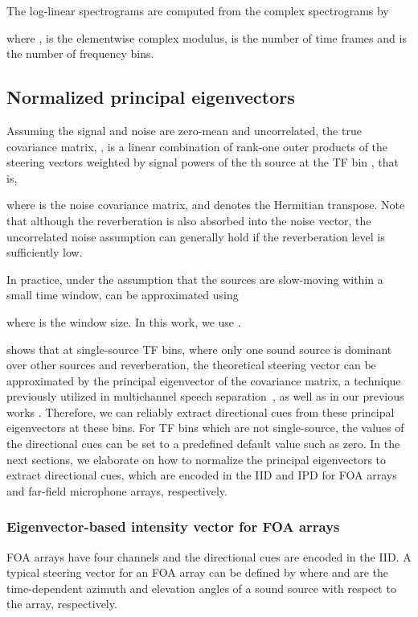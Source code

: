 \documentclass[journal]{IEEEtran}
\begin{document}
The log-linear spectrograms are computed from the complex spectrograms  by

where , is the elementwise complex modulus,  is the number of time frames and  is the number of frequency bins.

\subsection{Normalized principal eigenvectors}

Assuming the signal and noise are zero-mean and uncorrelated, the true covariance matrix, , is a linear combination of rank-one outer products of the steering vectors weighted by signal powers  of the th source at the TF bin , that is,

where  is the noise covariance matrix, and  denotes the Hermitian transpose. Note that although the reverberation is also absorbed into the noise vector, the uncorrelated noise assumption can generally hold if the reverberation level is sufficiently low.

In practice, under the assumption that the sources are slow-moving within a small time window,  can be approximated using

where  is the window size. In this work, we use .

 shows that at single-source TF bins, where only one sound source is dominant over other sources and reverberation, the theoretical steering vector  can be approximated by the principal eigenvector  of the covariance matrix, a technique previously utilized in multichannel speech separation~\cite{Asano2007DetectionArray}, as well as in our previous works \cite{Nguyen2014RobustSources, Nguyen2020RobustNetwork}.
Therefore, we can reliably extract directional cues from these principal eigenvectors at these bins. 
For TF bins which are not single-source, the values of the directional cues can be set to a predefined default value such as zero. In the next sections, we elaborate on how to normalize the principal eigenvectors to extract directional cues, which are encoded in the IID and IPD for FOA arrays and far-field microphone arrays, respectively.

\subsubsection{Eigenvector-based intensity vector for FOA arrays}
\label{subsec:eiv}

FOA arrays have four channels and the directional cues are encoded in the IID. A typical steering vector for an FOA array can be defined by
 \nobreak
where  and  are the time-dependent azimuth and elevation angles of a sound source with respect to the array, respectively.
\end{document}
